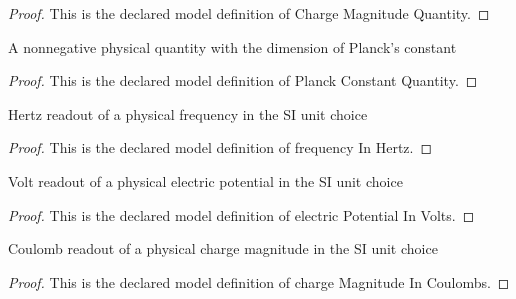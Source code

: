\begin{proof}
  This is the declared model definition of Charge Magnitude Quantity.
\end{proof}
\begin{definition}
  \label{def:physics:phyx-mini-0499:phyxminiproblems-problemphyxmini0499-planckconstantquantity}
  A nonnegative physical quantity with the dimension of Planck's constant
\end{definition}
\begin{proof}
  This is the declared model definition of Planck Constant Quantity.
\end{proof}
\begin{definition}
  \label{def:physics:phyx-mini-0499:phyxminiproblems-problemphyxmini0499-frequencyinhertz}
  Hertz readout of a physical frequency in the SI unit choice
\end{definition}
\begin{proof}
  This is the declared model definition of frequency In Hertz.
\end{proof}
\begin{definition}
  \label{def:physics:phyx-mini-0499:phyxminiproblems-problemphyxmini0499-electricpotentialinvolts}
  Volt readout of a physical electric potential in the SI unit choice
\end{definition}
\begin{proof}
  This is the declared model definition of electric Potential In Volts.
\end{proof}
\begin{definition}
  \label{def:physics:phyx-mini-0499:phyxminiproblems-problemphyxmini0499-chargemagnitudeincoulombs}
  Coulomb readout of a physical charge magnitude in the SI unit choice
\end{definition}
\begin{proof}
  This is the declared model definition of charge Magnitude In Coulombs.
\end{proof}
